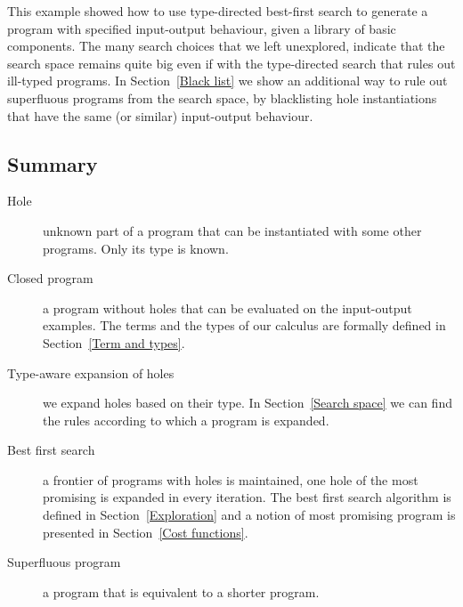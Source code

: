 This example showed how to use type-directed best-first search to generate a program with specified input-output behaviour, given a library of basic components.  The many search choices that we left unexplored, indicate that the search space remains quite big even if with the type-directed search that rules out ill-typed programs.  In Section~\ref{Black list} we show an additional way to rule out superfluous programs from the search space, by blacklisting hole instantiations that have the same (or similar) input-output behaviour.

\subsection{Summary}
\begin{description}
\item[Hole] unknown part of a program that can be instantiated with some other programs. Only its type is known.
\item[Closed program] a program without holes that can be evaluated on the input-output examples. The terms and the types of our calculus are formally defined in Section~\ref{Term and types}.
\item[Type-aware expansion of holes] we expand holes based on their type. In Section~\ref{Search space} we can find the rules according to which a program is expanded.
\item[Best first search] a frontier of programs with holes is maintained, one hole of the most promising is expanded in every iteration. The best first search algorithm is defined in Section~\ref{Exploration} and a notion of most promising program is presented in Section~\ref{Cost functions}.
\item[Superfluous program] a program that is equivalent to a shorter program. 
\end{description}
